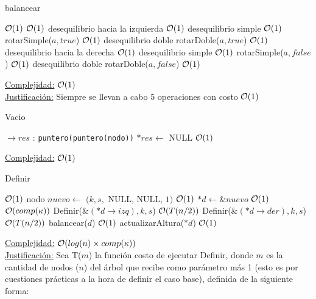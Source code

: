 \begin{Algoritmos}
\begin{algorithm}
\caption{balancear}
\begin{algorithmic}[1]
	\Comment $\mathcal{O}(1)$
 		\Comment $\mathcal{O}(1)$
 				\Comment desequilibrio hacia la izquierda $\mathcal{O}(1)$
 		   		\Comment desequilibrio simple $\mathcal{O}(1)$
 		   		\State rotarSimple($a, true$)
 		   		\Comment $\mathcal{O}(1)$
 		   	\Else \Comment desequilibrio doble
 		   		\State rotarDoble($a, true$)
 		   		\Comment $\mathcal{O}(1)$
 		   	\EndIf			
			\EndIf	
			\Else
				\Comment desequilibrio hacia la derecha $\mathcal{O}(1)$
 		   		\Comment desequilibrio simple $\mathcal{O}(1)$
 		   		\State rotarSimple($a, false$)
 		   		\Comment $\mathcal{O}(1)$
 		   	\Else \Comment desequilibrio doble
 		   		\State rotarDoble($a, false$)
 		   		\Comment $\mathcal{O}(1)$
 		   	\EndIf
			\EndIf
		\EndIf
  \EndIf
\EndProcedure
\end{algorithmic}
\underline{Complejidad:} $\mathcal{O}(1)$ \\
\underline{Justificación:} Siempre se llevan a cabo 5 operaciones con costo $\mathcal{O}(1)$
\end{algorithm}

\begin{algorithm}
\caption{Vacio}
\begin{algorithmic}[1]
$\to res$ : \texttt{puntero(puntero(nodo))}
	\State $*res \gets$ NULL
	\Comment $\mathcal{O}(1)$
\EndProcedure
\end{algorithmic}
\underline{Complejidad:} $\mathcal{O}(1)$
\end{algorithm}

\begin{algorithm}
\caption{Definir}
\begin{algorithmic}[1]
	\Comment $\mathcal{O}(1)$
    \State nodo $nuevo \gets$ $(k, s,$ NULL, NULL, $1)$
    \Comment $\mathcal{O}(1)$
    \State $*d \gets \&nuevo$
    \Comment $\mathcal{O}(1)$
  \Else
		\Comment $\mathcal{O}(comp(\kappa))$
			\State Definir($\&(*d\to izq), k, s$)
			\Comment $\mathcal{O}(T(n/2))$
		\Else
			\State Definir($\&(*d\to der), k, s$)
			\Comment $\mathcal{O}(T(n/2))$
		\EndIf
  \EndIf
  \State balancear($d$)
  \Comment $\mathcal{O}(1)$
  \State actualizarAltura($*d$)
  \Comment $\mathcal{O}(1)$
\EndProcedure
\end{algorithmic}
\underline{Complejidad:} $\mathcal{O}(log(n) \times comp(\kappa))$ \\
\underline{Justificación:} Sea T($m$) la función costo de ejecutar Definir, donde $m$ es la cantidad de nodos ($n$) del árbol que recibe como parámetro más 1 (esto es por cuestiones prácticas a la hora de definir el caso base), definida de la siguiente forma:


\end{algorithm}
\end{Algoritmos}
